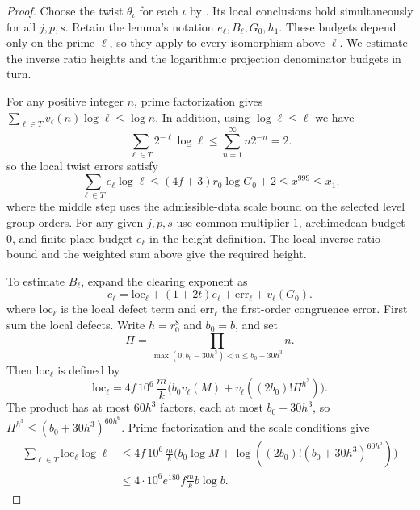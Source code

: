 \begin{proof}
Choose the twist $\theta_\iota$ for each $\iota$ by . Its local conclusions hold simultaneously for all $j,p,s$.
Retain the lemma's notation $e_\ell,B_\ell,G_0,h_1$. These budgets depend only on the prime $\ell$, so they apply to every isomorphism above $\ell$.
We estimate the inverse ratio heights and the logarithmic projection denominator budgets in turn.

For any positive integer $n$, prime factorization gives $\sum_{\ell\in T}v_\ell(n)\log\ell\le\log n$.
In addition, using $\log\ell\le\ell$ we have
\[
 \sum_{\ell\in T}2^{-\ell}\log\ell
 \le \sum_{n=1}^{\infty} n 2^{-n}=2.
\]
so the local twist errors satisfy
\[
 \sum_{\ell\in T}e_\ell\log\ell
 \le (4f+3)r_0\log G_0+2\le x^{999}\le x_1 .
\]
where the middle step uses the admissible-data scale bound on the selected level group orders.
For any given $j,p,s$ use common multiplier $1$, archimedean budget $0$, and finite-place budget $e_\ell$ in the height definition. The local inverse ratio bound and the weighted sum above give the required height.

To estimate $B_\ell$, expand the clearing exponent as
\[
 c_\ell
 =\mathrm{loc}_\ell+(1+2t)e_\ell+\mathrm{err}_\ell+v_\ell(G_0).
\]
where $\mathrm{loc}_\ell$ is the local defect term and $\mathrm{err}_\ell$ the first-order congruence error.
First sum the local defects. Write $h=r_0^8$ and $b_0=b$, and set
\[
 \Pi=\prod_{\max(0,b_0-30h^3)<n\le b_0+30h^3}n .
\]
Then $\mathrm{loc}_\ell$ is defined by
\[
 \mathrm{loc}_\ell
 =4f\,10^6\,\frac{m}{k}
  \bigl(b_0v_\ell(M)+v_\ell((2b_0)!\Pi^{h^3})\bigr).
\]
The product has at most $60h^3$ factors, each at most $b_0+30h^3$, so $\Pi^{h^3}\le(b_0+30h^3)^{60h^6}$.
Prime factorization and the scale conditions give
\begin{align*}
 \sum_{\ell\in T}\mathrm{loc}_\ell\log\ell
 &\le 4f\,10^6\,\frac{m}{k}
    \bigl(b_0\log M+\log((2b_0)!(b_0+30h^3)^{60h^6})\bigr)\\
 &\le 4\cdot10^6 e^{180} f\frac{m}{k}b\log b .
\end{align*}


\end{proof}
